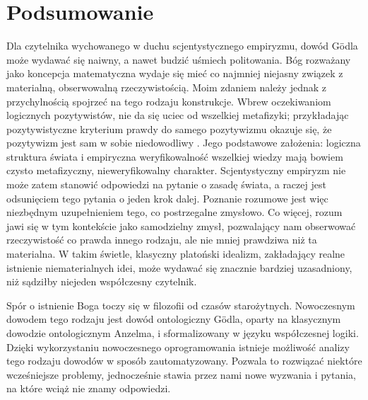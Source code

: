 \documentclass[
	runningheads
]{llncs}
\begin{document}
\section{Podsumowanie} \label{sec:summary}
Dla czytelnika wychowanego w duchu scjentystycznego empiryzmu, dowód G\"odla może wydawać się naiwny, a nawet budzić uśmiech politowania. Bóg rozważany jako koncepcja matematyczna wydaje się mieć co najmniej niejasny związek z materialną, obserwowalną rzeczywistością. Moim zdaniem należy jednak z przychylnością spojrzeć na tego rodzaju konstrukcje. Wbrew oczekiwaniom logicznych pozytywistów, nie da się uciec od wszelkiej metafizyki; przykładając pozytywistyczne kryterium prawdy do samego pozytywizmu okazuje się, że pozytywizm jest sam w sobie niedowodliwy \cite{putnam1985} \cite{stanford2005}. Jego podstawowe założenia: logiczna struktura świata i empiryczna weryfikowalność wszelkiej wiedzy mają bowiem czysto metafizyczny, nieweryfikowalny charakter. Scjentystyczny empiryzm nie może zatem stanowić odpowiedzi na pytanie o zasadę świata, a raczej jest odsunięciem tego pytania o jeden krok dalej. Poznanie rozumowe jest więc niezbędnym uzupełnieniem tego, co postrzegalne zmysłowo. Co więcej, rozum jawi się w tym kontekście jako samodzielny zmysł, pozwalający nam obserwować rzeczywistość co prawda innego rodzaju, ale nie mniej prawdziwa niż ta materialna. W takim świetle, klasyczny platoński idealizm, zakładający realne istnienie niematerialnych idei, może wydawać się znacznie bardziej uzasadniony, niż sądziłby niejeden współczesny czytelnik. 

Spór o istnienie Boga toczy się w filozofii od czasów starożytnych. Nowoczesnym dowodem tego rodzaju jest dowód ontologiczny G\"odla, oparty na klasycznym dowodzie ontologicznym Anzelma, i sformalizowany w języku współczesnej logiki. Dzięki wykorzystaniu nowoczesnego oprogramowania istnieje możliwość analizy tego rodzaju dowodów w sposób zautomatyzowany. Pozwala to rozwiązać niektóre wcześniejsze problemy, jednocześnie stawia przez nami nowe wyzwania i pytania, na które wciąż nie znamy odpowiedzi. 




\end{document}
